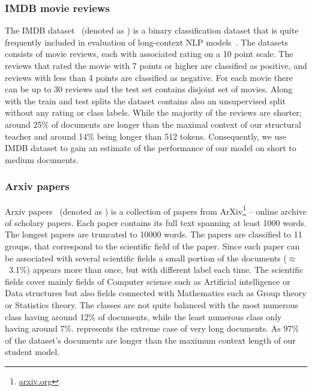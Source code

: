 \subsubsection{IMDB movie reviews}

The IMDB dataset~\citep{maas2011learning} (denoted as ) is a binary
classification dataset that is quite frequently included in evaluation of
long-context NLP models~\citep{zaheer2020big, beltagy2020longformer,
le2014distributed}. The datasets consists of movie reviews, each with associated
rating on a 10 point scale. The reviews that rated the movie with 7 points or
higher are classified as positive, and reviews with less than 4 points are
classified as negative. For each movie there can be up to 30 reviews and the
test set contains disjoint set of movies. Along with the train and test splits
the dataset contains also an unsupervised split without any rating or class
labels. While the majority of the reviews are shorter; around 25\% of documents
are longer than the maximal context of our structural teacher and around 14\%
being longer than 512 tokens. Consequently, we use IMDB dataset to gain an
estimate of the performance of our model on short to medium documents.

\subsubsection{Arxiv papers}

Arxiv papers~\citep{arxiv_papers} (denoted as ) is a collection of
papers from ArXiv\footnote{\url{arxiv.org}} -- online archive of scholary
papers. Each paper contains its full text spanning at least 1000 words. The
longest papers are truncated to 10000 words. The papers are classified to 11
groups, that correspond to the scientific field of the paper. Since each paper
can be associated with several scientific fields a small portion of the
documents ($\approx$~3.1\%) appears more than once, but with different label
each time. The scientific fields cover mainly fields of Computer science such as
Artificial intelligence or Data structures but also fields connected with
Mathematics such as Group theory or Statistics theory. The classes are not quite
balanced with the most numerous class having around 12\% of documents, while the
least numerous class only having around 7\%.  represents the extreme
case of very long documents. As 97\% of the dataset's documents are longer than
the maximum context length of our student model.

